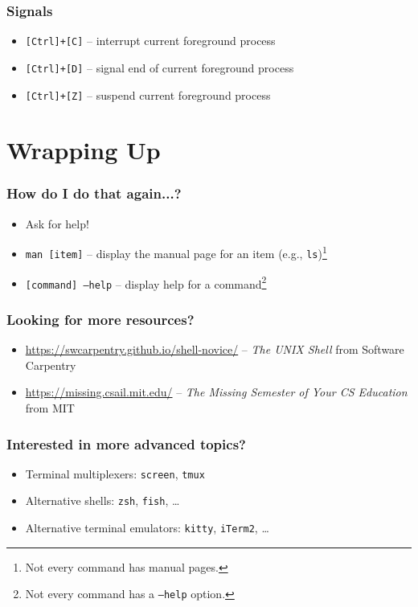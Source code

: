 \documentclass[aspectratio=169]{beamer}
\begin{document}
\begin{frame}
	\frametitle{Signals}
	\begin{itemize}
		\item \texttt{[Ctrl]+[C]} -- interrupt current foreground process
		\item \texttt{[Ctrl]+[D]} -- signal end of current foreground process
		\item \texttt{[Ctrl]+[Z]} -- suspend current foreground process
	\end{itemize}
\end{frame}


\section{Wrapping Up}

\frame{\sectionpage}

\begin{frame}
	\frametitle{How do I do that again...?}
	\begin{itemize}
		\item Ask for help!
		\item \texttt{man [item]} -- display the manual page for an item (e.g., \texttt{ls})\footnote{Not every command has manual pages.}
		\item \texttt{[command] --help} -- display help for a command\footnote{Not every command has a \texttt{--help} option.}
	\end{itemize}
\end{frame}

\begin{frame}
	\frametitle{Looking for more resources?}
	\begin{itemize}
		\item \url{https://swcarpentry.github.io/shell-novice/} -- \textit{The UNIX Shell} from Software Carpentry
		\item \url{https://missing.csail.mit.edu/} -- \textit{The Missing Semester of Your CS Education} from MIT
	\end{itemize}
\end{frame}

\begin{frame}
	\frametitle{Interested in more advanced topics?}
	\begin{itemize}
		\item Terminal multiplexers: \texttt{screen}, \texttt{tmux}
		\item Alternative shells: \texttt{zsh}, \texttt{fish}, \ldots
		\item Alternative terminal emulators: \texttt{kitty}, \texttt{iTerm2}, \ldots
	\end{itemize}
\end{frame}
\end{document}

